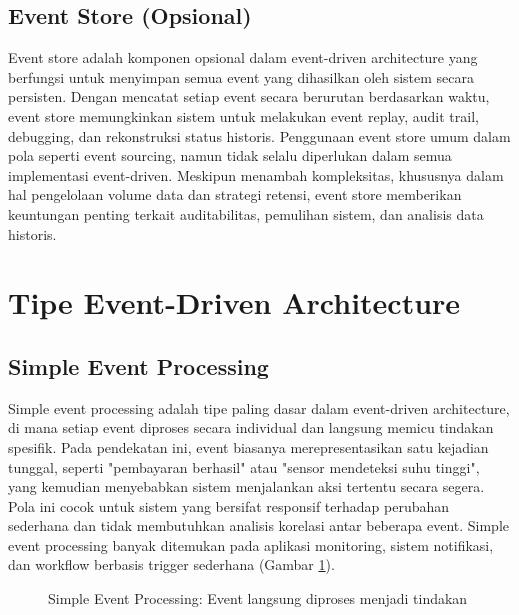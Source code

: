 \subsection{Event Store (Opsional)}
Event store adalah komponen opsional dalam event-driven architecture yang berfungsi untuk menyimpan semua event yang dihasilkan oleh sistem secara persisten. Dengan mencatat setiap event secara berurutan berdasarkan waktu, event store memungkinkan sistem untuk melakukan event replay, audit trail, debugging, dan rekonstruksi status historis. Penggunaan event store umum dalam pola seperti event sourcing, namun tidak selalu diperlukan dalam semua implementasi event-driven. Meskipun menambah kompleksitas, khususnya dalam hal pengelolaan volume data dan strategi retensi, event store memberikan keuntungan penting terkait auditabilitas, pemulihan sistem, dan analisis data historis.


\section{Tipe Event-Driven Architecture}

\subsection{Simple Event Processing}
Simple event processing adalah tipe paling dasar dalam event-driven architecture, di mana setiap event diproses secara individual dan langsung memicu tindakan spesifik. Pada pendekatan ini, event biasanya merepresentasikan satu kejadian tunggal, seperti "pembayaran berhasil" atau "sensor mendeteksi suhu tinggi", yang kemudian menyebabkan sistem menjalankan aksi tertentu secara segera. Pola ini cocok untuk sistem yang bersifat responsif terhadap perubahan sederhana dan tidak membutuhkan analisis korelasi antar beberapa event. Simple event processing banyak ditemukan pada aplikasi monitoring, sistem notifikasi, dan workflow berbasis trigger sederhana (Gambar \ref{fig:simple-event-processing}).

\begin{figure}[h]
	\centering
	\caption{Simple Event Processing: Event langsung diproses menjadi tindakan}
	\label{fig:simple-event-processing}
\end{figure}

